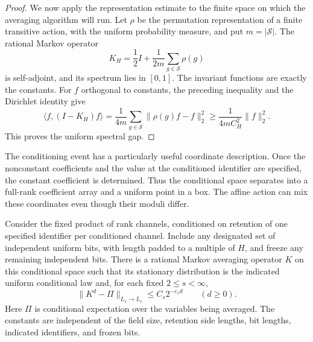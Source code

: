 \begin{proof}
We now apply the representation estimate to the finite space on which the averaging algorithm will run. Let $\rho$ be the permutation representation of a finite transitive
action, with the uniform probability measure, and put $m=|\mathcal S|$.
The rational Markov operator
\[
K_H=\frac12I+\frac1{2m}\sum_{g\in\mathcal S}\rho(g)
\]
is self-adjoint, and its spectrum lies in $[0,1]$. The invariant
functions are exactly the constants. For $f$ orthogonal to constants,
the preceding inequality and the Dirichlet identity give
\[
\langle f,(I-K_H)f\rangle
=\frac1{4m}\sum_{g\in\mathcal S}\|\rho(g)f-f\|_2^2
\ge\frac1{4mC_H^2}\|f\|_2^2.
\]
This proves the uniform spectral gap.
\end{proof}

The conditioning event has a particularly useful coordinate description. Once the nonconstant coefficients and the value at the conditioned identifier are specified, the constant coefficient is determined. Thus the conditional space separates into a full-rank coefficient array and a uniform point in a box. The affine action can mix these coordinates even though their moduli differ.

\begin{lemma}\label{lem:env-gap}
Consider the fixed product of rank channels, conditioned on retention of
one specified identifier per conditioned channel. Include any designated
set of independent uniform bits, with length padded to a multiple of
$H$, and freeze any remaining independent bits.
There is a rational Markov averaging operator $K$ on this conditional
space such that its stationary distribution is the indicated uniform
conditional law and, for each fixed $2\le s<\infty$,
\[
\|K^d-\Pi\|_{L_s\to L_s}\le C_s2^{-c_sd}
\qquad(d\ge0).
\]
Here $\Pi$ is conditional expectation over the variables being averaged.
The constants are independent of the field size, retention side
lengths, bit lengths, indicated identifiers, and frozen bits.
\end{lemma}

